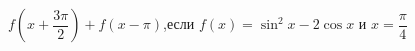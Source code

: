 \begin{ex}[type=calculate_expression]
	\begin{condition}
		\( f\left( x+\dfrac{3\pi}{2} \right)+f\left( x-\pi \right) \),\quad если \( f(x)=\sin^2 x -2\cos x \) и \( x=\dfrac{\pi}{4} \)
	\end{condition}
\end{ex}
